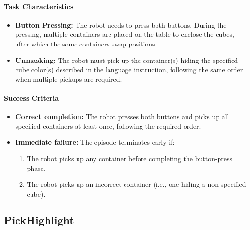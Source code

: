 \vspace{-0.2cm}
\paragraph{Task Characteristics}
\begin{itemize}[itemsep=1pt, topsep=0pt, leftmargin=*]
    \item \textbf{Button Pressing:} The robot needs to press both buttons. During the pressing, multiple containers are placed on the table to enclose the cubes, after which the some containers swap positions. 
    
    \item \textbf{Unmasking:} The robot must pick up the container(s) hiding the specified cube color(s) described in the language instruction, following the same order when multiple pickups are required.
\end{itemize}

\vspace{-0.2cm}
\paragraph{Success Criteria}
\begin{itemize}[itemsep=1pt, topsep=0pt, leftmargin=*]
    \item \textbf{Correct completion:} The robot presses both buttons and picks up all specified containers at least once, following the required order.
    
    \item \textbf{Immediate failure:} The episode terminates early if:
    \begin{enumerate}[itemsep=1pt, topsep=0pt, leftmargin=*]
        \item The robot picks up any container before completing the button-press phase.
        \item The robot picks up an incorrect container (i.e., one hiding a non-specified cube).
    \end{enumerate}
\end{itemize}

\clearpage




\subsection{PickHighlight}
\label{sec:task_pickhighlight}

